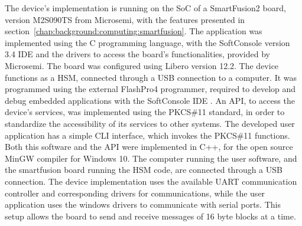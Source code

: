 The device's implementation is running on the \ac{SoC} of a SmartFusion2 board, version M2S090TS from Microsemi, with the features presented in section~\ref{chap:background:computing:smartfusion}.
The application was implemented using the C programming language, with the SoftConsole version 3.4 \ac{IDE} and the drivers to access the board's functionalities, provided by Microsemi. The board was configured using Libero version 12.2.
The device functions as a \ac{HSM}, connected through a \ac{USB} connection to a computer. It was programmed using the external FlashPro4 programmer, required to develop and debug embedded applications with the SoftConsole IDE \cite{smartfusionSecurityPractices}.
An API, to access the device's services, was implemented using the \ac{PKCS}\#11 standard, in order to standardize the accessibility of its services to other systems. The developed user application has a simple \ac{CLI} interface, which invokes the PKCS\#11 functions. Both this software and the API were implemented in C++, for the open source MinGW compiler for Windows 10.
The computer running the user software, and the smartfusion board running the HSM code, are connected through a \ac{USB} connection.
The device implementation uses the available \ac{UART} communication controller and corresponding drivers for communications, while the user application uses the windows drivers to communicate with serial ports.
This setup allows the board to send and receive messages of 16 byte blocks at a time.


